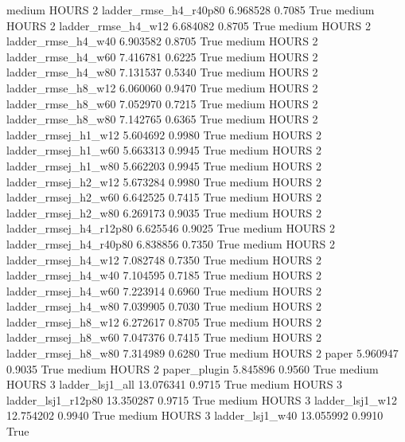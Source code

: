     medium    HOURS                 2  ladder_rmse_h4_r40p80   6.968528      0.7085    True
    medium    HOURS                 2     ladder_rmse_h4_w12   6.684082      0.8705    True
    medium    HOURS                 2     ladder_rmse_h4_w40   6.903582      0.8705    True
    medium    HOURS                 2     ladder_rmse_h4_w60   7.416781      0.6225    True
    medium    HOURS                 2     ladder_rmse_h4_w80   7.131537      0.5340    True
    medium    HOURS                 2     ladder_rmse_h8_w12   6.060060      0.9470    True
    medium    HOURS                 2     ladder_rmse_h8_w60   7.052970      0.7215    True
    medium    HOURS                 2     ladder_rmse_h8_w80   7.142765      0.6365    True
    medium    HOURS                 2    ladder_rmsej_h1_w12   5.604692      0.9980    True
    medium    HOURS                 2    ladder_rmsej_h1_w60   5.663313      0.9945    True
    medium    HOURS                 2    ladder_rmsej_h1_w80   5.662203      0.9945    True
    medium    HOURS                 2    ladder_rmsej_h2_w12   5.673284      0.9980    True
    medium    HOURS                 2    ladder_rmsej_h2_w60   6.642525      0.7415    True
    medium    HOURS                 2    ladder_rmsej_h2_w80   6.269173      0.9035    True
    medium    HOURS                 2 ladder_rmsej_h4_r12p80   6.625546      0.9025    True
    medium    HOURS                 2 ladder_rmsej_h4_r40p80   6.838856      0.7350    True
    medium    HOURS                 2    ladder_rmsej_h4_w12   7.082748      0.7350    True
    medium    HOURS                 2    ladder_rmsej_h4_w40   7.104595      0.7185    True
    medium    HOURS                 2    ladder_rmsej_h4_w60   7.223914      0.6960    True
    medium    HOURS                 2    ladder_rmsej_h4_w80   7.039905      0.7030    True
    medium    HOURS                 2    ladder_rmsej_h8_w12   6.272617      0.8705    True
    medium    HOURS                 2    ladder_rmsej_h8_w60   7.047376      0.7415    True
    medium    HOURS                 2    ladder_rmsej_h8_w80   7.314989      0.6280    True
    medium    HOURS                 2                  paper   5.960947      0.9035    True
    medium    HOURS                 2           paper_plugin   5.845896      0.9560    True
    medium    HOURS                 3        ladder_lsj1_all  13.076341      0.9715    True
    medium    HOURS                 3     ladder_lsj1_r12p80  13.350287      0.9715    True
    medium    HOURS                 3        ladder_lsj1_w12  12.754202      0.9940    True
    medium    HOURS                 3        ladder_lsj1_w40  13.055992      0.9910    True
